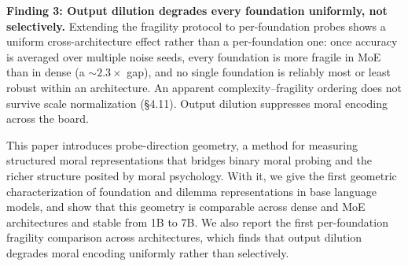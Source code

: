 \textbf{Finding 3: Output dilution degrades every foundation uniformly,
not selectively.} Extending the fragility protocol to per-foundation
probes shows a uniform cross-architecture effect rather than a
per-foundation one: once accuracy is averaged over multiple noise
seeds, every foundation is more fragile in MoE than in dense (a
\({\sim}2.3\times\) gap), and no single foundation is reliably most or
least robust within an architecture. An apparent complexity--fragility
ordering does not survive scale normalization (\S4.11). Output dilution
suppresses moral encoding across the board.

This paper introduces probe-direction geometry, a method for
measuring structured moral representations that bridges binary moral
probing and the richer structure posited by moral psychology. With
it, we give the first geometric characterization of foundation and
dilemma representations in base language models, and show that this
geometry is comparable across dense and MoE architectures and stable
from 1B to 7B. We also report the first per-foundation fragility
comparison across architectures, which finds that output dilution
degrades moral encoding uniformly rather than selectively.
